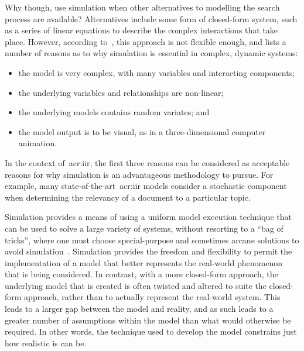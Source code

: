 Why though, use simulation when other alternatives to modelling the search process are available? Alternatives include some form of closed-form system, such as a series of linear equations to describe the complex interactions that take place. However, according to~\citealp{fishwick1995simulation}, this approach is not flexible enough, and lists a number of reasons as to why simulation is essential in complex, dynamic systems:

\begin{itemize}
    \item{the model is very complex, with many variables and interacting components;}
    \item{the underlying variables and relationships are non-linear;}
    \item{the underlying models contains random variates; and}
    \item{the model output is to be visual, as in a three-dimensional computer animation.}
\end{itemize}

In the context of~\gls{acr:iir}, the first three reasons can be considered as acceptable reasons for why simulation is an advantageous methodology to pursue. For example, many state-of-the-art~\gls{acr:iir} models consider a stochastic component when determining the relevancy of a document to a particular topic.

Simulation provides a means of using a uniform model execution technique that can be used to solve a large variety of systems, without resorting to a ``bag of tricks'', where one must choose special-purpose and sometimes arcane solutions to avoid simulation~\citep{fishwick1995simulation}. Simulation provides the freedom and flexibility to permit the implementation of a model that better represents the real-world phenomenon that is being considered. In contrast, with a more closed-form approach, the underlying model that is created is often twisted and altered to suite the closed-form approach, rather than to actually represent the real-world system. This leads to a larger gap between the model and reality, and as such leads to a greater number of assumptions within the model than what would otherwise be required. In other words, the technique used to develop the model constrains just how realistic is can be.


